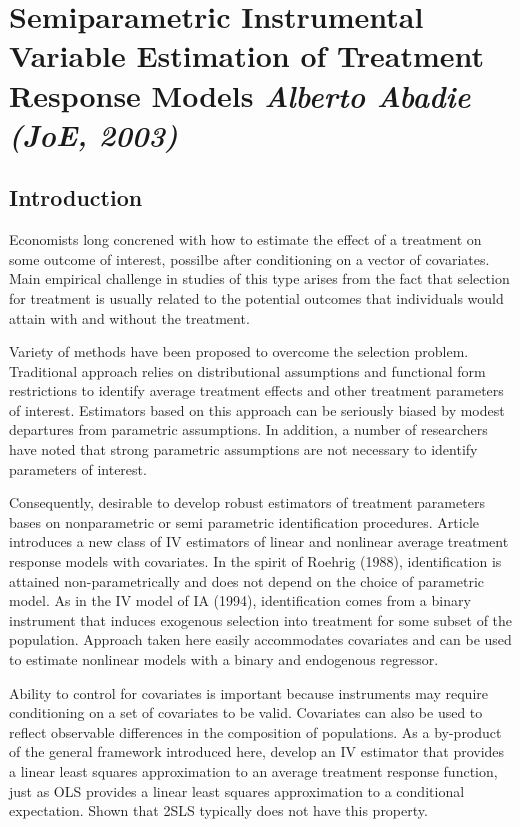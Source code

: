 
\newpage
\section{Semiparametric Instrumental Variable Estimation of Treatment Response Models \textit{\small Alberto Abadie (JoE, 2003)}}

\subsection{Introduction}

Economists long concrened with how to estimate the effect of a treatment on some outcome of interest, possilbe after conditioning on a vector of covariates. Main empirical challenge in studies of this type arises from the fact that selection for treatment is usually related to the potential outcomes that individuals would attain with and without the treatment. 

Variety of methods have been proposed to overcome the selection problem. Traditional approach relies on distributional assumptions and functional form restrictions to identify average treatment effects and other treatment parameters of interest. Estimators based on this approach can be seriously biased by modest departures from parametric assumptions. In addition, a number of researchers have noted that strong parametric assumptions are not necessary to identify parameters of interest. 

Consequently, desirable to develop robust estimators of treatment parameters bases on nonparametric or semi parametric identification procedures. Article introduces a new class of IV estimators of linear and nonlinear average treatment response models with covariates. In the spirit of Roehrig (1988), identification is attained non-parametrically and does not depend on the choice of parametric model. As in the IV model of IA (1994), identification comes from a binary instrument that induces exogenous selection into treatment for some subset of the population. Approach taken here easily accommodates covariates and can be used to estimate nonlinear models with a binary and endogenous regressor. 

Ability to control for covariates is important because instruments may require conditioning on a set of covariates to be valid. Covariates can also be used to reflect observable differences in the composition of populations. As a by-product of the general framework introduced here, develop an IV estimator that provides a linear least squares approximation to an average treatment response function, just as OLS provides a linear least squares approximation to a conditional expectation. Shown that 2SLS typically does not have this property. 

